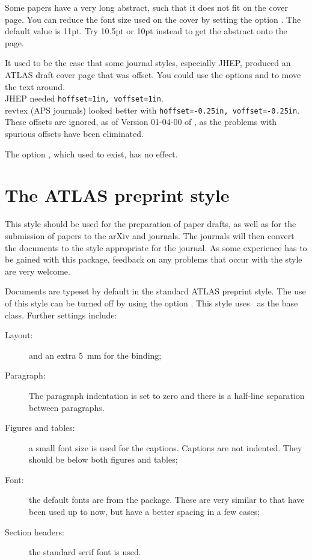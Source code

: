Some papers have a very long abstract, such that it does not fit on the cover page.
You can reduce the font size used on the cover by setting the option .
The default value is 11pt. Try 10.5pt or 10pt instead to get the abstract onto the page.

It used to be the case that some journal styles, especially JHEP,
produced an ATLAS draft cover page that was offset.
You could use the options  and  to move the text around.\\
JHEP needed \verb|hoffset=1in, voffset=1in|.\\
revtex (APS journals) looked better with  \verb|hoffset=-0.25in, voffset=-0.25in|.\\
These offsets are ignored, as of Version 01-04-00 of ,
as the problems with spurious offsets have been eliminated.

The option , which used to exist, has no effect.


\section{The ATLAS preprint style}
\label{sec:atlasstyle}

This style should be used for the preparation of paper drafts,
as well as for the submission of papers to the arXiv and journals.
The journals will then convert the documents to the style appropriate for the journal.
As some experience has to be gained with this package,
feedback on any problems that occur with the style are very welcome.

Documents are typeset by default in the standard ATLAS preprint style.
The use of this style can be turned off by using the option
.
This style uses \KOMAScript\ as the base class.
Further settings include:
\begin{description}
\item[Layout:]  and an extra \SI{5}{\mm} for the binding;
\item[Paragraph:] The paragraph indentation is set to zero and 
  there is a half-line separation between paragraphs.
\item[Figures and tables:] a small font size is used for the captions.
  Captions are not indented.
  They should be below both figures and tables;
\item[Font:] the default fonts are from the  package.
  These are very similar to  that have been used up to now,
  but have a better spacing in a few cases;
\item[Section headers:] the standard serif font is used.
\end{description}

